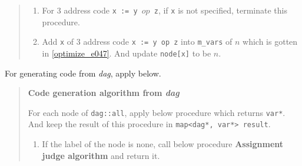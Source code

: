 \begin{quote}
\begin{enumerate}
\item For 3 address code {\tt{x := y $op$ z}}, if {\tt{x}} is not specified,
      terminate this procedure.

\item Add {\tt{x}} of 3 address code {\tt{x := y op z}} into
      {\tt{m\_vars}} of $n$ which is gotten in \ref{optimize_e047}.
      And update {\tt{node[x]}} to be $n$. 
\end{enumerate}

\end{quote}

For generating code from {\em dag}, apply below.

\begin{quote}
{\bf Code generation algorithm from {\em dag}}

For each node of {\tt{dag::all}}, apply below procedure which returns
{\tt{var*}}. And keep the result of this procedure in
{\tt{map<dag*, var*> result}}.

\begin{enumerate}
\item If the label of the node is none, call below procedure
      {\bf Assignment judge algorithm} and return it.


\end{enumerate}
\end{quote}
